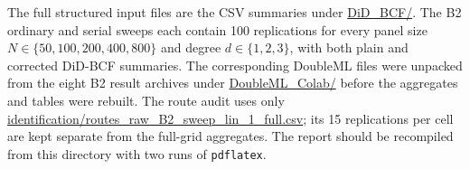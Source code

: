 \documentclass[11pt]{article}
\begin{document}
The full structured input files are the CSV summaries under \url{DiD_BCF/}.
The B2 ordinary and serial sweeps each contain 100 replications for every
panel size $N\in\{50,100,200,400,800\}$ and degree $d\in\{1,2,3\}$, with both
plain and corrected DiD-BCF summaries. The corresponding DoubleML files were
unpacked from the eight B2 result archives under \url{DoubleML_Colab/} before
the aggregates and tables were rebuilt. The route audit uses only
\url{identification/routes_raw_B2_sweep_lin_1_full.csv}; its 15 replications
per cell are kept separate from the full-grid aggregates. The report should be
recompiled from this directory with two runs of \texttt{pdflatex}.
\end{document}
